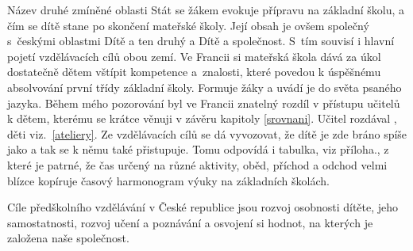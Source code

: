 Název druhé zmíněné oblasti Stát se žákem evokuje přípravu na základní školu, a čím se dítě stane po skončení mateřské školy. Její obsah je ovšem společný s českými oblastmi Dítě a ten druhý a Dítě a společnost. S tím souvisí i hlavní pojetí vzdělávacích cílů obou zemí. Ve Francii si mateřská škola dává za úkol dostatečně dětem vštípit kompetence a znalosti, které povedou k úspěšnému absolvování první třídy základní školy. Formuje žáky a uvádí je do světa psaného jazyka. Během mého pozorování byl ve Francii znatelný rozdíl v přístupu učitelů k dětem, kterému se krátce věnuji v závěru kapitoly \ref{srovnani}. Učitel rozdával , děti  viz.~\ref{ateliery}. Ze vzdělávacích cílů se dá vyvozovat, že dítě je zde bráno spíše jako  a tak se k němu také přistupuje. Tomu odpovídá i tabulka, viz příloha., z které je patrné, že čas určený na různé aktivity, oběd, příchod a odchod velmi blízce kopíruje časový harmonogram výuky na základních školách. 

Cíle předškolního vzdělávání v České republice jsou rozvoj osobnosti dítěte, jeho samostatnosti, rozvoj učení a poznávání a osvojení si hodnot, na kterých je založena naše společnost. 
